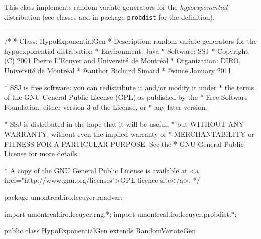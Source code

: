 
This class implements random variate generators for the 
\emph{hypoexponential} distribution (see classes 
 and
in package \texttt{probdist} for the definition).

\bigskip\hrule

\begin{code}
\begin{hide}
/*
 * Class:        HypoExponentialGen
 * Description:  random variate generators for the hypoexponential distribution 
 * Environment:  Java
 * Software:     SSJ 
 * Copyright (C) 2001  Pierre L'Ecuyer and Université de Montréal
 * Organization: DIRO, Université de Montréal
 * @author       Richard Simard
 * @since        January 2011

 * SSJ is free software: you can redistribute it and/or modify it under
 * the terms of the GNU General Public License (GPL) as published by the
 * Free Software Foundation, either version 3 of the License, or
 * any later version.

 * SSJ is distributed in the hope that it will be useful,
 * but WITHOUT ANY WARRANTY; without even the implied warranty of
 * MERCHANTABILITY or FITNESS FOR A PARTICULAR PURPOSE.  See the
 * GNU General Public License for more details.

 * A copy of the GNU General Public License is available at
   <a href="http://www.gnu.org/licenses">GPL licence site</a>.
 */
\end{hide}
package umontreal.iro.lecuyer.randvar;\begin{hide}
import umontreal.iro.lecuyer.rng.*;
import umontreal.iro.lecuyer.probdist.*;
\end{hide}

public class HypoExponentialGen extends RandomVariateGen \begin{hide} {
\end{hide}\end{code}

